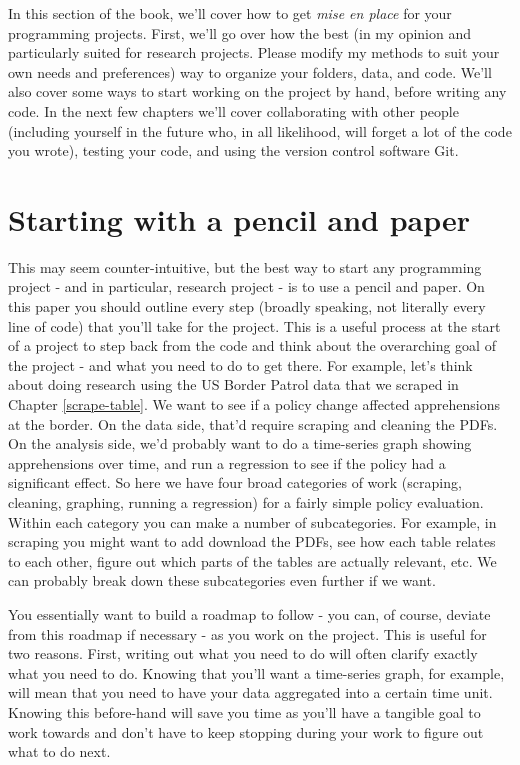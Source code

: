 \documentclass[
  12pt,
]{book}
\begin{document}
In this section of the book, we'll cover how to get \emph{mise en place} for your programming projects. First, we'll go over how the best (in my opinion and particularly suited for research projects. Please modify my methods to suit your own needs and preferences) way to organize your folders, data, and code. We'll also cover some ways to start working on the project by hand, before writing any code. In the next few chapters we'll cover collaborating with other people (including yourself in the future who, in all likelihood, will forget a lot of the code you wrote), testing your code, and using the version control software Git.

\hypertarget{starting-with-a-pencil-and-paper}{%
\section{Starting with a pencil and paper}\label{starting-with-a-pencil-and-paper}}

This may seem counter-intuitive, but the best way to start any programming project - and in particular, research project - is to use a pencil and paper. On this paper you should outline every step (broadly speaking, not literally every line of code) that you'll take for the project. This is a useful process at the start of a project to step back from the code and think about the overarching goal of the project - and what you need to do to get there. For example, let's think about doing research using the US Border Patrol data that we scraped in Chapter \ref{scrape-table}. We want to see if a policy change affected apprehensions at the border. On the data side, that'd require scraping and cleaning the PDFs. On the analysis side, we'd probably want to do a time-series graph showing apprehensions over time, and run a regression to see if the policy had a significant effect. So here we have four broad categories of work (scraping, cleaning, graphing, running a regression) for a fairly simple policy evaluation. Within each category you can make a number of subcategories. For example, in scraping you might want to add download the PDFs, see how each table relates to each other, figure out which parts of the tables are actually relevant, etc. We can probably break down these subcategories even further if we want.

You essentially want to build a roadmap to follow - you can, of course, deviate from this roadmap if necessary - as you work on the project. This is useful for two reasons. First, writing out what you need to do will often clarify exactly what you need to do. Knowing that you'll want a time-series graph, for example, will mean that you need to have your data aggregated into a certain time unit. Knowing this before-hand will save you time as you'll have a tangible goal to work towards and don't have to keep stopping during your work to figure out what to do next.
\end{document}

